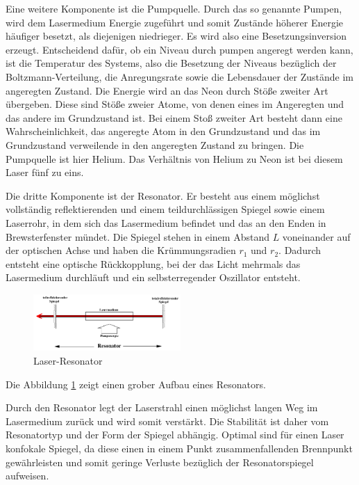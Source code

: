 \noindent Eine weitere Komponente ist die Pumpquelle. Durch das so genannte Pumpen, wird dem Lasermedium Energie zugeführt und somit Zustände höherer Energie häufiger besetzt, als diejenigen niedrieger. Es wird also eine Besetzungsinversion erzeugt. Entscheidend dafür, ob ein Niveau durch pumpen angeregt werden kann, ist die Temperatur des Systems, also die Besetzung der Niveaus bezüglich der Boltzmann-Verteilung, die Anregungsrate sowie die Lebensdauer der Zustände im angeregten Zustand. Die Energie wird an das Neon durch Stöße zweiter Art übergeben. Diese sind Stöße zweier Atome, von denen eines im Angeregten und das andere im Grundzustand ist. Bei einem Stoß zweiter Art besteht dann eine Wahrscheinlichkeit, das angeregte Atom in den Grundzustand und das im Grundzustand verweilende in den angeregten Zustand zu bringen. Die Pumpquelle ist hier Helium. Das Verhältnis von Helium zu Neon ist bei diesem Laser fünf zu eins.

\noindent Die dritte Komponente ist der Resonator. Er besteht aus einem möglichst vollständig reflektierenden und einem teildurchlässigen Spiegel sowie einem Laserrohr, in dem sich das Lasermedium befindet und das an den Enden in Brewsterfenster mündet. Die Spiegel stehen in einem Abstand \(L\)  voneinander auf der optischen Achse und haben die Krümmungsradien \(r_1\) und \(r_2\). Dadurch entsteht eine optische Rückkopplung, bei der das Licht mehrmals das Lasermedium durchläuft und ein selbsterregender Oszillator entsteht. 

\begin{figure}
	\centering
	\includegraphics[width=0.5\textwidth]{img/resonator}
	\caption{Laser-Resonator \cite{V61}}
	\label{fig:resonator}
\end{figure}

\noindent Die Abbildung \ref{fig:resonator} zeigt einen grober Aufbau eines Resonators.

\noindent Durch den Resonator legt der Laserstrahl einen möglichst langen Weg im Lasermedium zurück und wird somit verstärkt. Die Stabilität ist daher vom Resonatortyp und der Form der Spiegel abhängig. Optimal sind für einen Laser konfokale Spiegel, da diese einen in einem Punkt zusammenfallenden Brennpunkt gewährleisten und somit geringe Verluste bezüglich der Resonatorspiegel aufweisen.

